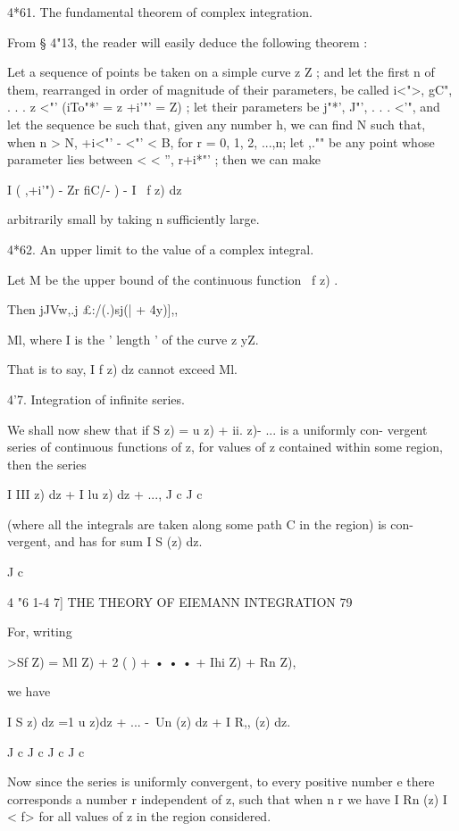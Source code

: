 4*61. The fundamental theorem of complex integration.

From § 4"13, the reader will easily deduce the following theorem :

Let a sequence of points be taken on a simple curve z Z ; and let the
first n of them, rearranged in order of magnitude of their parameters,
be called i<">, gC", . . . z <"' (iTo"*' = z +i'"' = Z) ; let their
parameters be j"*', J"', . . . <'", and let the sequence be such that,
given any number h, we can find N such that, when n > N, +i<"' - <"' <
B, for r = 0, 1, 2, ...,n; let ,."" be any point whose parameter lies
between < < '', r+i*"' ; then we can make

I ( ,+i'") - Zr fiC/- ) - I \ f z) dz

arbitrarily small by taking n sufficiently large.

4*62. An upper limit to the value of a complex integral.

Let M be the upper bound of the continuous function \ f z) .

Then jJVw,.j £:/(.)sj(| + 4y)],,

 Ml, where I is the ' length ' of the curve z yZ.

That is to say, I f z) dz cannot exceed Ml.

4'7. Integration of infinite series.

We shall now shew that if S z) = u z) + ii. z)- ... is a uniformly
con- vergent series of continuous functions of z, for values of z
contained within some region, then the series

I III z) dz + I lu z) dz + ..., J c J c

(where all the integrals are taken along some path C in the region) is
con- vergent, and has for sum I S (z) dz.

J c



4 "6 1-4 7] THE THEORY OF EIEMANN INTEGRATION 79

For, writing

>Sf Z) = Ml Z) + 2 ( ) + • • • + Ihi Z) + Rn Z),

we have

I S z) dz =1 u z)dz + ... -\ Un (z) dz + I R,, (z) dz.

J c J c J c J c

Now since the series is uniformly convergent, to every positive number
e there corresponds a number r independent of z, such that when n r we
have I Rn (z) I < f> for all values of z in the region considered.

